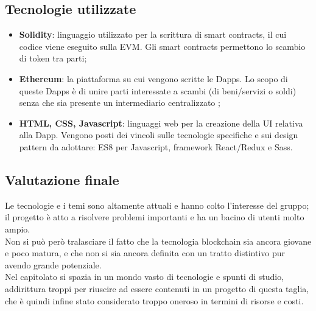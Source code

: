 \subsection{Tecnologie utilizzate}
\begin{itemize}
	\item \textbf{Solidity}: linguaggio utilizzato per la scrittura di smart contracts, il cui codice viene eseguito sulla EVM. Gli smart contracts permettono lo scambio di token tra parti;
	
	\item \textbf{Ethereum}: la piattaforma su cui vengono scritte le Dapps. Lo scopo di queste Dapps è di unire parti interessate a scambi (di beni/servizi o soldi) senza che sia presente un intermediario centralizzato ;
	
	\item \textbf{HTML, CSS, Javascript}: linguaggi web per la creazione della UI relativa alla Dapp. Vengono posti dei vincoli sulle tecnologie specifiche e sui design pattern da adottare: ES8 per Javascript, framework React/Redux e Sass.
\end{itemize}
\subsection{Valutazione finale}
Le tecnologie e i temi sono altamente attuali e hanno colto l’interesse del gruppo; il progetto è atto a risolvere problemi importanti e ha un bacino di utenti molto ampio.\\
Non si può però tralasciare il fatto che la tecnologia blockchain sia ancora giovane e poco matura, e che non si sia ancora definita con un tratto distintivo pur avendo grande potenziale.\\
Nel capitolato si spazia in un mondo vasto di tecnologie e spunti di studio, addirittura troppi per riuscire ad essere contenuti in un progetto di questa taglia, che è quindi infine stato considerato troppo oneroso in termini di risorse e costi.



